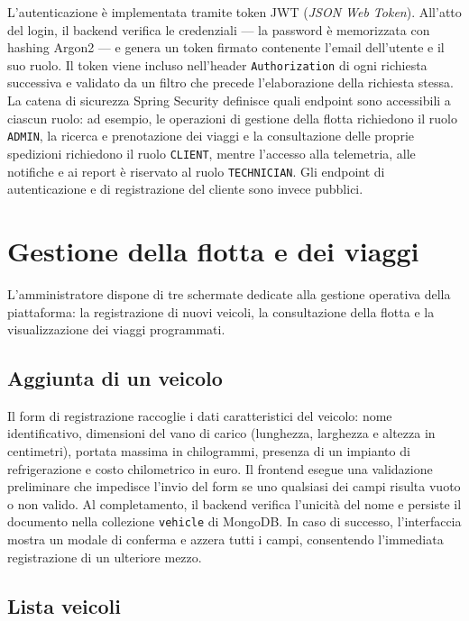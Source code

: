 L'autenticazione è implementata tramite token JWT (\textit{JSON Web Token}). All'atto del login, il backend verifica le credenziali --- la password è memorizzata con hashing Argon2 --- e genera un token firmato contenente l'email dell'utente e il suo ruolo. Il token viene incluso nell'header \texttt{Authorization} di ogni richiesta successiva e validato da un filtro che precede l'elaborazione della richiesta stessa. La catena di sicurezza Spring Security definisce quali endpoint sono accessibili a ciascun ruolo: ad esempio, le operazioni di gestione della flotta richiedono il ruolo \texttt{ADMIN}, la ricerca e prenotazione dei viaggi e la consultazione delle proprie spedizioni richiedono il ruolo \texttt{CLIENT}, mentre l'accesso alla telemetria, alle notifiche e ai report è riservato al ruolo \texttt{TECHNICIAN}. Gli endpoint di autenticazione e di registrazione del cliente sono invece pubblici.


\section{Gestione della flotta e dei viaggi}
\label{sec:gestione_flotta}

L'amministratore dispone di tre schermate dedicate alla gestione operativa della piattaforma: la registrazione di nuovi veicoli, la consultazione della flotta e la visualizzazione dei viaggi programmati.

\subsection{Aggiunta di un veicolo}

Il form di registrazione raccoglie i dati caratteristici del veicolo: nome identificativo, dimensioni del vano di carico (lunghezza, larghezza e altezza in centimetri), portata massima in chilogrammi, presenza di un impianto di refrigerazione e costo chilometrico in euro. Il frontend esegue una validazione preliminare che impedisce l'invio del form se uno qualsiasi dei campi risulta vuoto o non valido. Al completamento, il backend verifica l'unicità del nome e persiste il documento nella collezione \texttt{vehicle} di MongoDB. In caso di successo, l'interfaccia mostra un modale di conferma e azzera tutti i campi, consentendo l'immediata registrazione di un ulteriore mezzo.

\subsection{Lista veicoli}

